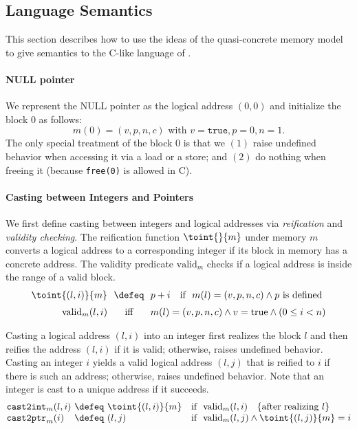



\subsection{Language Semantics}

This section describes how to use the ideas of the quasi-concrete memory model to give semantics to the C-like language of .

\paragraph{NULL pointer} 
We represent the NULL pointer as the logical address $(0,0)$ and 
initialize the block $0$ as follows:
\[
m(0) = (v,p,n,c) \text{ with } v=\texttt{true}, p=0, n=1.
\]
The only special treatment of the block $0$ is that we $(1)$ raise
undefined behavior when accessing it via a load or a store;
and $(2)$ do nothing when freeing it (because \texttt{free(0)} is allowed in C).

\paragraph{Casting between Integers and Pointers}
We first define casting between integers and logical addresses via \emph{reification} and \emph{validity checking}.
The reification function $\toint{}{m}$ under memory $m$
converts a logical address to a corresponding integer if its block in memory has a concrete address.
The validity predicate $\text{valid}_m$ checks if a logical address
is inside the range of a valid block.
\[
\begin{array}{@{}r@{~~}c@{~~}ll@{}}
\toint{(l, i)}{m} &\defeq& p + i &\text{if }~ m(l) = (v, p, n, c) \land p\text{ is defined} \\[2mm]
\text{valid}_m(l,i) &\text{iff}& 
\multicolumn{2}{@{}l@{}}{
m(l) = (v, p, n, c) \land v=\mathrm{true} \land (0\le i < n)}
\\
\end{array}
\]

Casting a logical address $(l,i)$ into an integer first realizes the
block $l$ and then reifies the address $(l,i)$ if it is valid;
otherwise, raises undefined behavior.  Casting an integer $i$ yields a
valid logical address $(l,j)$ that is reified to $i$ if there is such
an address; otherwise, raises undefined behavior. Note that 
an integer is cast to a unique address if it succeeds.
\[
\begin{array}{@{}l@{~}c@{~}ll@{}}
\texttt{cast2int}_m(l,i) &\defeq& \toint{(l,i)}{m} &\text{if }~ \text{valid}_m(l,i)
~~~\text{\{after realizing $l$\}}
\\
\texttt{cast2ptr}_m(i)   &\defeq& (l,j) & \text{if }~ \text{valid}_m(l,j) \land \toint{(l,j)}{m}=i \\
\end{array}
\]

